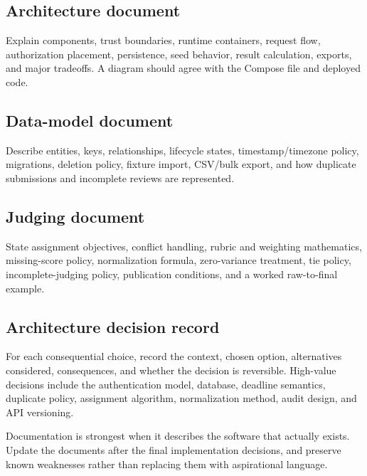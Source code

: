 \documentclass[11pt]{article}
\begin{document}
\subsection{Architecture document}

Explain components, trust boundaries, runtime containers, request flow, authorization placement, persistence, seed behavior, result calculation, exports, and major tradeoffs. A diagram should agree with the Compose file and deployed code.

\subsection{Data-model document}

Describe entities, keys, relationships, lifecycle states, timestamp/timezone policy, migrations, deletion policy, fixture import, CSV/bulk export, and how duplicate submissions and incomplete reviews are represented.

\subsection{Judging document}

State assignment objectives, conflict handling, rubric and weighting mathematics, missing-score policy, normalization formula, zero-variance treatment, tie policy, incomplete-judging policy, publication conditions, and a worked raw-to-final example.

\subsection{Architecture decision record}

For each consequential choice, record the context, chosen option, alternatives considered, consequences, and whether the decision is reversible. High-value decisions include the authentication model, database, deadline semantics, duplicate policy, assignment algorithm, normalization method, audit design, and API versioning.

\begin{advicebox}
Documentation is strongest when it describes the software that actually exists. Update the documents after the final implementation decisions, and preserve known weaknesses rather than replacing them with aspirational language.
\end{advicebox}

\end{document}
